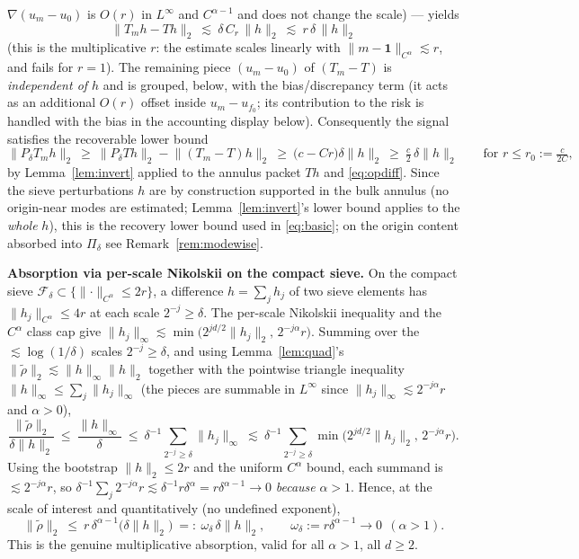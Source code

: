 \documentclass[11pt]{article}
\theoremstyle{remark}
\newcommand{\F}{\mathcal{F}}
\newcommand{\one}{\mathbf{1}}
\newcommand{\norm}[1]{\lVert #1\rVert}
\newcommand{\SET}[1]{\{#1\}}
\begin{document}
$\nabla(u_m-u_0)$ is $O(r)$ in $L^\infty$ and $C^{\alpha-1}$ and does not
change the scale) --- yields
\[
\norm{T_mh-Th}_2
\ \lesssim\ \delta\,C_r\,\norm{h}_2\ \lesssim\ r\,\delta\,\norm{h}_2
\]
(this is the multiplicative $r$: the estimate scales linearly with
$\norm{m-\one}_{C^\alpha}\lesssim r$, and fails for $r=1$). The remaining
piece $(u_m-u_0)$ of $(T_m-T)$ is \emph{independent of $h$} and is
grouped, below, with the bias/discrepancy term (it acts as an additional
$O(r)$ offset inside $u_m-u_{f_0}$; its contribution to the risk is
handled with the bias in the accounting display below).
Consequently the signal satisfies the recoverable lower bound
\begin{equation}\label{eq:infsupapp}
\norm{P_\delta T_mh}_2
\ \ge\ \norm{P_\delta Th}_2-\norm{(T_m-T)h}_2
\ \ge\ \bigl(c-Cr\bigr)\delta\norm h_2
\ \ge\ \tfrac c2\,\delta\norm h_2
\qquad\text{for }r\le r_0:=\tfrac{c}{2C},
\end{equation}
by Lemma~\ref{lem:invert} applied to the annulus packet $Th$ and
\eqref{eq:opdiff}. Since the sieve perturbations $h$ are by
construction supported in the bulk annulus (no origin-near modes are
estimated; Lemma~\ref{lem:invert}'s lower bound applies to the
\emph{whole} $h$), this is the recovery lower bound used in
\eqref{eq:basic}; on the origin content absorbed into $\Pi_\delta$ see
Remark~\ref{rem:modewise}.

\par\noindent\textbf{Absorption via per-scale Nikolskii on the compact sieve.}
On the compact sieve $\F_\delta\subset\SET{\norm{\cdot}_{C^\alpha}\le2r}$,
a difference $h=\sum_j h_j$ of two sieve elements has
$\norm{h_j}_{C^\alpha}\le4r$ at each scale $2^{-j}\ge\delta$. The
per-scale Nikolskii inequality and the $C^\alpha$ class cap give
$\norm{h_j}_\infty\lesssim\min\bigl(2^{jd/2}\norm{h_j}_2,\,
2^{-j\alpha}r\bigr)$. Summing over the $\lesssim\log(1/\delta)$ scales
$2^{-j}\ge\delta$, and using Lemma~\ref{lem:quad}'s
$\norm{\widetilde\rho}_2\lesssim\norm{h}_\infty\norm{h}_2$ together with
the pointwise triangle inequality $\norm{h}_\infty\le\sum_j\norm{h_j}_\infty$
(the pieces are summable in $L^\infty$ since $\norm{h_j}_\infty\lesssim
2^{-j\alpha}r$ and $\alpha>0$),
\[
\frac{\norm{\widetilde\rho}_2}{\delta\norm{h}_2}
\ \le\ \frac{\norm{h}_\infty}{\delta}
\ \le\ \delta^{-1}\sum_{2^{-j}\ge\delta}\norm{h_j}_\infty
\ \lesssim\ \delta^{-1}\sum_{2^{-j}\ge\delta}
\min\bigl(2^{jd/2}\norm{h_j}_2,\,2^{-j\alpha}r\bigr).
\]
Using the bootstrap $\norm{h}_2\le2r$ and the uniform $C^\alpha$ bound,
each summand is $\lesssim2^{-j\alpha}r$, so
$\delta^{-1}\sum_{j}2^{-j\alpha}r\lesssim\delta^{-1}r\delta^{\alpha}
=r\delta^{\alpha-1}\to0$ \emph{because} $\alpha>1$. Hence, at the scale of
interest and quantitatively (no undefined exponent),
\begin{equation}\label{eq:absorb}
\norm{\widetilde\rho}_2\ \le\ r\,\delta^{\alpha-1}\bigl(\delta\norm{h}_2\bigr)
\ =:\ \omega_\delta\,\delta\norm{h}_2,
\qquad \omega_\delta:=r\delta^{\alpha-1}\to0\ \ (\alpha>1).
\end{equation}
This is the genuine multiplicative absorption, valid for all $\alpha>1$,
all $d\ge2$.
\end{document}
